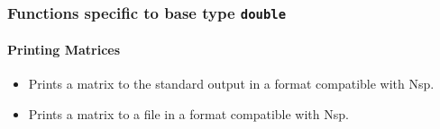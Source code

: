 \subsubsection{Functions specific to base type {\tt double}}

\paragraph{Printing Matrices}
\begin{itemize}  
\item {}
  \sshortdescribe Prints a matrix to the standard output in a format
  compatible with Nsp.  
  
\item {}
  \sshortdescribe Prints a matrix to a file in a format
  compatible with Nsp.  
\end{itemize}

